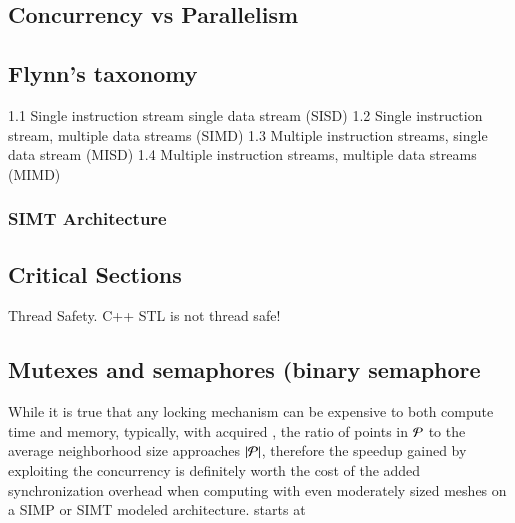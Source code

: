 %
\subsection{Concurrency vs Parallelism}
\label{ch2sACssCVP}

%
\subsection{Flynn's taxonomy}
1.1	Single instruction stream single data stream (SISD)
1.2	Single instruction stream, multiple data streams (SIMD)
1.3	Multiple instruction streams, single data stream (MISD)
1.4	Multiple instruction streams, multiple data streams (MIMD)

\subsubsection{SIMT Architecture}%
%
\subsection{Critical Sections}
\label{ch2sPPssCS}
Thread Safety. C++ STL is not thread safe!

%
\subsection{Mutexes and semaphores (binary semaphore}
\label{ch2sPPssMS}
While it is true that any locking mechanism can be expensive to both compute time and memory,  typically, with acquired \tdd{}, the ratio of points in $\mathcal{P}$ to the average neighborhood size  approaches $|\mathcal{P}|$, therefore the speedup gained by exploiting the concurrency is definitely worth the cost of the added synchronization overhead when computing with even moderately sized meshes on a SIMP or SIMT modeled architecture.
starts at ~\cite[~p.20]{Lang17}

%
